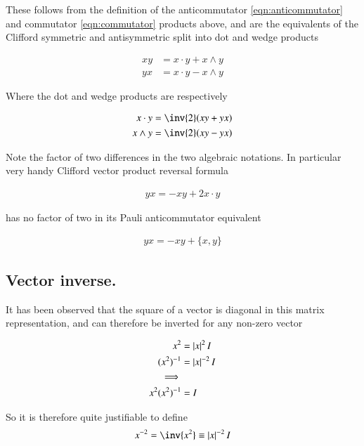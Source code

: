 \documentclass{article}
\newcommand{\symmetric}[2]{{\{{#1},{#2}\}}}
\begin{document}
These follows from the definition of the anticommutator 
\ref{eqn:anticommutator}
and commutator 
\ref{eqn:commutator}
products above, and are the equivalents of the Clifford symmetric and antisymmetric split into dot and wedge products

\begin{align}
x y &= {x} \cdot {y} + {x} \wedge {y} \\
y x &= {x} \cdot {y} - {x} \wedge {y}
\end{align}

Where the dot and wedge products are respectively

\begin{align*}
x \cdot y &= \inv{2}(x y + y x) \\
x \wedge y &= \inv{2}(x y - y x)
\end{align*}

Note the factor of two differences in the two algebraic notations.  In particular very handy Clifford vector product reversal formula

\begin{align*}
y x = - x y + 2 x \cdot y
\end{align*}

has no factor of two in its Pauli anticommutator equivalent

\begin{align}
y x = - x y + \symmetric{x}{y}
\end{align}

\subsection{ Vector inverse. }

It has been observed that the square of a vector is diagonal in this matrix representation, and can therefore be inverted for any non-zero vector

\begin{align*}
x^2 &= \left\lvert{x}\right\rvert^2 I \\
(x^2)^{-1} &= \left\lvert{x}\right\rvert^{-2} I \\
\implies \\
x^2 (x^2)^{-1} &= I \\
\end{align*}

So it is therefore quite justifiable to define
\begin{align*}
x^{-2} = \inv{x^2} \equiv \Abs{x}^{-2} I \\
\end{align*}
\end{document}
